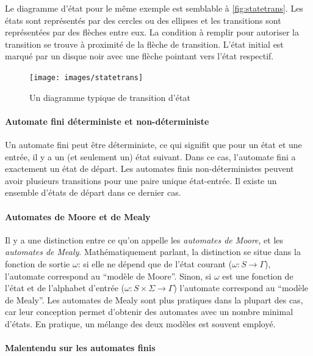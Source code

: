 \documentclass[a4paper,12pt,BCOR=6mm,bibtotoc,idxtotoc]{scrbook}
\begin{document}
Le diagramme d'\'etat pour le m\^eme exemple est semblable \`a
\autoref{fig:statetrans}. Les \'etats sont repr\'esent\'es par des
cercles ou des ellipses et les transitions sont repr\'esent\'ees par
des fl\`eches entre eux.  La condition \`a remplir pour autoriser la
transition se trouve \`a proximit\'e de la fl\`eche de transition.
L'\'etat initial est marqu\'e par un disque noir avec une fl\`eche
pointant vers l'\'etat respectif.

\begin{figure}[htbp]
  \centering
  \texttt{[image: images/statetrans]}
  \caption{Un diagramme typique de transition d'\'etat}
  \label{fig:statetrans}
\end{figure}

\paragraph{Automate fini d\'eterministe et non-d\'eterministe}

Un automate fini peut \^etre d\'eterministe, ce qui signifit que pour
un \'etat et une entr\'ee, il y a un (et seulement un) \'etat
suivant. Dans ce cas, l'automate fini a exactement un \'etat de
d\'epart. Les automates finis non-d\'eterministes peuvent avoir
plusieurs transitions pour une paire unique \'etat-entr\'ee.
Il existe un ensemble d'\'etats de d\'epart dans ce dernier cas.



\paragraph{Automates de Moore et de Mealy}

Il y a une distinction entre ce qu'on appelle les \textit{automates de
  Moore}, et les \textit{automates de Mealy}.  Math\'ematiquement
parlant, la distinction se situe dans la fonction de sortie $\omega$:
si elle ne d\'epend que de l'\'etat courant ($\omega: S \rightarrow
\Gamma$), l'automate correspond au ``mod\`ele de Moore''. Sinon, si
$\omega$ est une fonction de l'\'etat et de l'alphabet d'entr\'ee
($\omega: S \times \Sigma \rightarrow \Gamma$) l'automate correspond
au ``mod\`ele de Mealy''. Les automates de Mealy sont plus
pratiques dans la plupart des cas, car leur conception permet d'obtenir
des automates avec un nombre minimal d'\'etats. En pratique, un m\'elange
des deux mod\`eles est souvent employ\'e.

\paragraph{Malentendu sur les automates finis}
\end{document}
